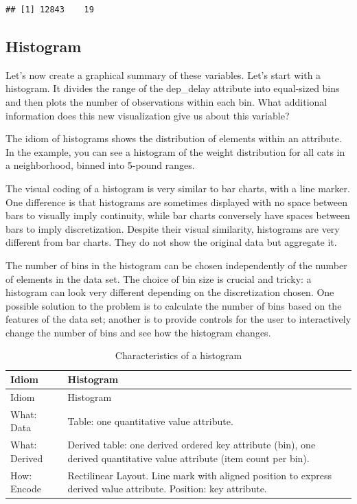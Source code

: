 \documentclass[
]{book}
\begin{document}
\begin{verbatim}
## [1] 12843    19
\end{verbatim}

\hypertarget{histogram}{%
\subsection{Histogram}\label{histogram}}

Let's now create a graphical summary of these variables. Let's start with a histogram. It divides the range of the dep\_delay attribute into equal-sized bins and then plots the number of observations within each bin. What additional information does this new visualization give us about this variable?

The idiom of histograms shows the distribution of elements within an attribute. In the example, you can see a histogram of the weight distribution for all cats in a neighborhood, binned into 5-pound ranges.

The visual coding of a histogram is very similar to bar charts, with a line marker. One difference is that histograms are sometimes displayed with no space between bars to visually imply continuity, while bar charts conversely have spaces between bars to imply discretization. Despite their visual similarity, histograms are very different from bar charts. They do not show the original data but aggregate it.

The number of bins in the histogram can be chosen independently of the number of elements in the data set. The choice of bin size is crucial and tricky: a histogram can look very different depending on the discretization chosen. One possible solution to the problem is to calculate the number of bins based on the features of the data set; another is to provide controls for the user to interactively change the number of bins and see how the histogram changes.

\begin{longtable}[]{@{}
  >{\raggedright\arraybackslash}p{}
  >{\raggedright\arraybackslash}p{}@{}}
\caption{Characteristics of a histogram \citep{munzner2014visualization}}\tabularnewline
\toprule
Idiom & Histogram \\
\midrule
\endfirsthead
\toprule
Idiom & Histogram \\
\midrule
\endhead
What: Data & Table: one quantitative value attribute. \\
What: Derived & Derived table: one derived ordered key attribute (bin), one derived quantitative value attribute (item count per bin). \\
How: Encode & Rectilinear Layout. Line mark with aligned position to express derived value attribute. Position: key attribute. \\
\bottomrule
\end{longtable}
\end{document}
